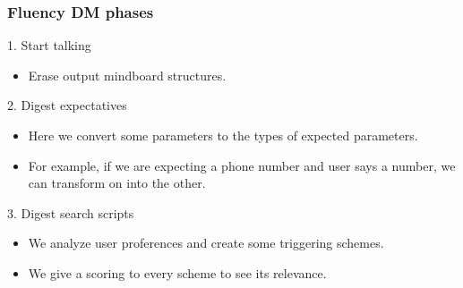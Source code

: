 \documentclass[11pt]{beamer}
\begin{document}
\begin{frame}[fragile]
\frametitle{Fluency DM phases}
	\begin{block}{1. Start talking}
	\begin{itemize}
		\item Erase output mindboard structures.
	\end{itemize}
	\end{block}
	\pause
	\begin{block}{2. Digest expectatives}
	\begin{itemize}
		\item Here we convert some parameters to the types of expected parameters.
		\item For example, if we are expecting a phone number and user says a number, we can transform on into the other.
	\end{itemize}
	\end{block}
	\pause
	\begin{block}{3. Digest search scripts}
	\begin{itemize}
		\item We analyze user proferences and create some triggering schemes.
		\item We give a scoring to every scheme to see its relevance.
	\end{itemize}
	\end{block}
\end{frame}
\end{document}
